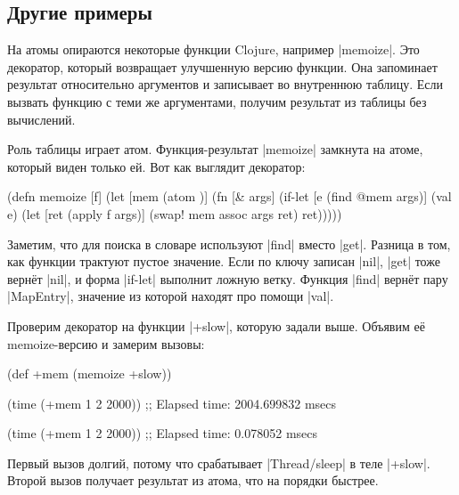 \subsection{Другие примеры}


На атомы опираются некоторые функции Clojure, например \spverb|memoize|. Это
декоратор, который возвращает улучшенную версию функции. Она запоминает
результат относительно аргументов и записывает во внутреннюю таблицу. Если
вызвать функцию с теми же аргументами, получим результат из таблицы без
вычислений.

Роль таблицы играет атом. Функция-результат \spverb|memoize| замкнута на атоме,
который виден только ей. Вот как выглядит декоратор:

\begin{english}
  \begin{clojure}
(defn memoize [f]
  (let [mem (atom {})]
    (fn [& args]
      (if-let [e (find @mem args)]
        (val e)
        (let [ret (apply f args)]
          (swap! mem assoc args ret)
          ret)))))
  \end{clojure}
\end{english}


Заметим, что для поиска в словаре используют \spverb|find| вместо
\spverb|get|. Разница в том, как функции трактуют пустое значение. Если по ключу
записан \spverb|nil|, \spverb|get| тоже верн\"{е}т \spverb|nil|, и форма
\spverb|if-let| выполнит ложную ветку. Функция \spverb|find| верн\"{е}т пару
\spverb|MapEntry|, значение из которой находят про помощи \spverb|val|.

Проверим декоратор на функции \spverb|+slow|, которую задали выше. Объявим е\"{е}
memoize-версию и замерим вызовы:

\begin{english}
  \begin{clojure}
(def +mem (memoize +slow))

(time (+mem 1 2 2000))
;; Elapsed time: 2004.699832 msecs

(time (+mem 1 2 2000))
;; Elapsed time: 0.078052 msecs
  \end{clojure}
\end{english}


Первый вызов долгий, потому что срабатывает \spverb|Thread/sleep| в теле
\spverb|+slow|. Второй вызов получает результат из атома, что на порядки
быстрее.

